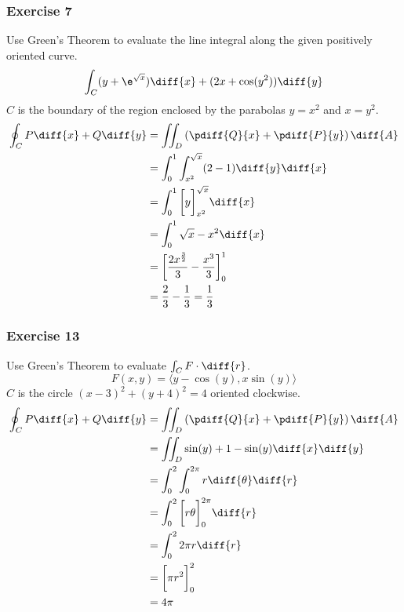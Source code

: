 \documentclass{math}
\begin{document}
\subsubsection*{Exercise 7}
Use Green's Theorem to evaluate the line integral along the given positively
oriented curve.
\[ \int_{C}(y+\e^{\sqrt{x}})\diff{x}+(2x+\cos(y^2))\diff{y} \]
\( C \) is the boundary of the region enclosed by the parabolas \( y = x^2 \)
and \( x = y^2 \).
\begin{align*}
  \oint_{C}P\diff{x}+Q\diff{y} &=
    \iint_{D}\left(\pdiff{Q}{x}+\pdiff{P}{y}\right)\diff{A} \\
  &= \int_{0}^{1}\int_{x^2}^{\sqrt{x}}(2-1)\diff{y}\diff{x} \\
  &= \int_{0}^{1}\bigg[y\bigg]_{x^2}^{\sqrt{x}}\diff{x} \\
  &= \int_{0}^{1}\sqrt{x}-x^2\diff{x} \\
  &= \bigg[\frac{2x^{\frac{3}{2}}}{3}-\frac{x^3}{3}\bigg]_{0}^{1} \\
  &= \frac{2}{3}-\frac{1}{3} = \frac{1}{3}
\end{align*}

\subsubsection*{Exercise 13}
Use Green's Theorem to evaluate \( \int_{C}F\cdot\diff{r} \).
\[ F(x,y) = \langle y-\cos(y),x\sin(y)\rangle \]
\( C \) is the circle \( (x-3)^2+(y+4)^2 = 4 \) oriented clockwise.
\begin{align*}
  \oint_{C}P\diff{x}+Q\diff{y} &=
    \iint_{D}\left(\pdiff{Q}{x}+\pdiff{P}{y}\right)\diff{A} \\
  &= \iint_{D}\sin(y)+1-\sin(y)\diff{x}\diff{y} \\
  &= \int_{0}^{2}\int_{0}^{2\pi}r\diff{\theta}\diff{r} \\
  &= \int_{0}^{2}\bigg[r\theta\bigg]_{0}^{2\pi}\diff{r} \\
  &= \int_{0}^{2}2\pi r\diff{r} \\
  &= \bigg[\pi r^2\bigg]_{0}^{2} \\
  &= 4\pi
\end{align*}
\end{document}
